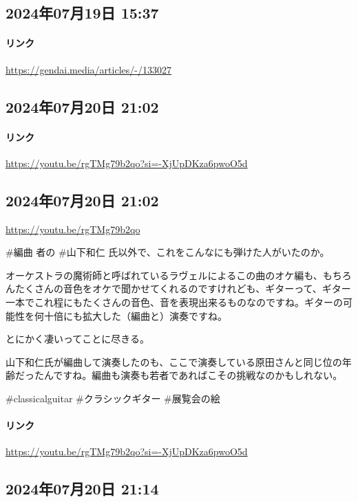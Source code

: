 \subsection*{2024年07月19日 15:37}

\paragraph{リンク}
\url{https://gendai.media/articles/-/133027}

\subsection*{2024年07月20日 21:02}

\paragraph{リンク}
\url{https://youtu.be/rgTMg79b2qo?si=-XjUpDKza6pwoO5d}

\subsection*{2024年07月20日 21:02}

\url{https://youtu.be/rgTMg79b2qo}

\#編曲 者の \#山下和仁 氏以外で、これをこんなにも弾けた人がいたのか。

オーケストラの魔術師と呼ばれているラヴェルによるこの曲のオケ編も、もちろんたくさんの音色をオケで聞かせてくれるのですけれども、ギターって、ギター一本でこれ程にもたくさんの音色、音を表現出来るものなのですね。ギターの可能性を何十倍にも拡大した（編曲と）演奏ですね。

とにかく凄いってことに尽きる。

山下和仁氏が編曲して演奏したのも、ここで演奏している原田さんと同じ位の年齢だったんですね。編曲も演奏も若者であればこその挑戦なのかもしれない。

\#classicalguitar \#クラシックギター \#展覧会の絵

\paragraph{リンク}
\url{https://youtu.be/rgTMg79b2qo?si=-XjUpDKza6pwoO5d}

\subsection*{2024年07月20日 21:14}

